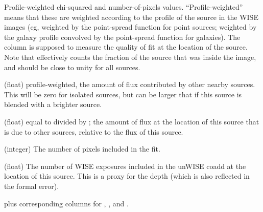 \documentclass[12pt,preprint]{aastex}
\begin{document}
\begin{description}
  Profile-weighted chi-squared and number-of-pixels values.
  ``Profile-weighted'' means that these are weighted according to the
  profile of the source in the WISE images (eg, weighted by the
  point-spread function for point sources; weighted by the galaxy
  profile convolved by the point-spread function for galaxies).  The
  column  is supposed to measure the quality of
  fit at the location of the source.  Note that 
  effectively counts the fraction of the source that was inside the
  image, and should be close to unity for all sources.
\item[\colname{w1\_proflux}] (float) profile-weighted, the amount of
  flux contributed by other nearby sources.  This will be zero for
  isolated sources, but can be larger that 
  if this source is blended with a brighter source.
\item[\colname{w1\_profracflux}] (float) equal to
   divided by ; the
  amount of flux at the location of this source that is due to other
  sources, relative to the flux of this source.
\item[\colname{w1\_npix}] (integer) The number of pixels included in
  the fit.
\item[\colname{w1\_pronexp}] (float) The number of WISE exposures
  included in the unWISE coadd at the location of this source.  This
  is a proxy for the depth (which is also reflected in the formal
  error).
\end{description}
plus corresponding columns for , , and
.
\end{document}

